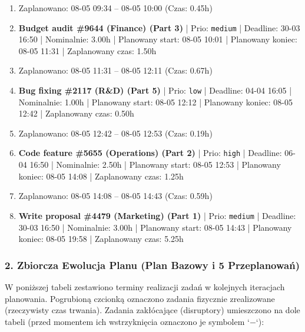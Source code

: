 {\begin{enumerate}
  \item [\textbf{PRZERWA}] Zaplanowano: 08-05 09:34 -- 08-05 10:00 (Czas: 0.45h)
  \item [\textbf{14659}] \textbf{Budget audit \#9644 (Finance) (Part 3)} | Prio: \texttt{medium} | Deadline: 30-03 16:50 | Nominalnie: 3.00h | Planowany start: 08-05 10:01 | Planowany koniec: 08-05 11:31 | Zaplanowany czas: 1.50h
  \item [\textbf{PRZERWA}] Zaplanowano: 08-05 11:31 -- 08-05 12:11 (Czas: 0.67h)
  \item [\textbf{14689}] \textbf{Bug fixing \#2117 (R\&D) (Part 5)} | Prio: \texttt{low} | Deadline: 04-04 16:05 | Nominalnie: 1.00h | Planowany start: 08-05 12:12 | Planowany koniec: 08-05 12:42 | Zaplanowany czas: 0.50h
  \item [\textbf{PRZERWA}] Zaplanowano: 08-05 12:42 -- 08-05 12:53 (Czas: 0.19h)
  \item [\textbf{14626}] \textbf{Code feature \#5655 (Operations) (Part 2)} | Prio: \texttt{high} | Deadline: 06-04 16:50 | Nominalnie: 2.50h | Planowany start: 08-05 12:53 | Planowany koniec: 08-05 14:08 | Zaplanowany czas: 1.25h
  \item [\textbf{PRZERWA}] Zaplanowano: 08-05 14:08 -- 08-05 14:43 (Czas: 0.59h)
  \item [\textbf{14660}] \textbf{Write proposal \#4479 (Marketing) (Part 1)} | Prio: \texttt{medium} | Deadline: 30-03 16:50 | Nominalnie: 3.00h | Planowany start: 08-05 14:43 | Planowany koniec: 08-05 19:58 | Zaplanowany czas: 5.25h
\end{enumerate}
}

\subsubsection*{2. Zbiorcza Ewolucja Planu (Plan Bazowy i 5 Przeplanowań)}

W poniższej tabeli zestawiono terminy realizacji zadań w kolejnych iteracjach planowania. Pogrubioną czcionką oznaczono zadania fizycznie zrealizowane (rzeczywisty czas trwania). Zadania zakłócające (disruptory) umieszczono na dole tabeli (przed momentem ich wstrzyknięcia oznaczono je symbolem `$-$`):


